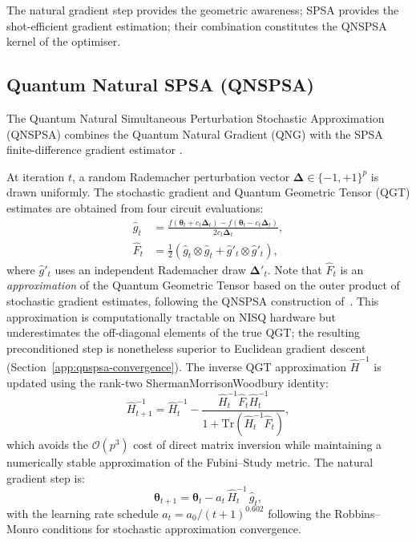 \documentclass[11pt,a4paper, english]{book}
\theoremstyle{plain}
\theoremstyle{definition}
\numberwithin{equation}{chapter}
\numberwithin{figure}{chapter}
\numberwithin{table}{chapter}
\begin{document}
The natural gradient step provides the geometric awareness; SPSA provides the
shot-efficient gradient estimation; their combination constitutes the QNSPSA kernel
of the optimiser.

\subsection{Quantum Natural SPSA (QNSPSA)}
\label{subsec:qnspsa}

The Quantum Natural Simultaneous Perturbation Stochastic Approximation
(QNSPSA) combines the Quantum Natural Gradient (QNG) \cite{Stokes_2020}
with the SPSA finite-difference gradient estimator \cite{Spall_1998}.

At iteration $t$, a random Rademacher perturbation vector
$\boldsymbol{\Delta} \in \{-1,+1\}^p$ is drawn uniformly.  The stochastic
gradient and Quantum Geometric Tensor (QGT) estimates are obtained from
four circuit evaluations:
\begin{align}
  \label{eq:qnspsa_gradient}
  \hat{g}_t &= \frac{f(\boldsymbol{\theta}_t + c_t\boldsymbol{\Delta}_t)
                     - f(\boldsymbol{\theta}_t - c_t\boldsymbol{\Delta}_t)}
                    {2c_t\boldsymbol{\Delta}_t}, \\
  \label{eq:qgt_estimate}
  \hat{F}_t &= \frac{1}{2}\!\left(
    \hat{g}_t \otimes \hat{g}_t
    + \hat{g}'_t \otimes \hat{g}'_t\right),
\end{align}
where $\hat{g}'_t$ uses an independent Rademacher draw $\boldsymbol{\Delta}'_t$.
Note that $\hat{F}_t$ is an \emph{approximation} of the 
Quantum Geometric Tensor based on the outer product of 
stochastic gradient estimates, following the QNSPSA 
construction of~\cite{Gacon_2021}. This approximation 
is computationally tractable on NISQ hardware but 
underestimates the off-diagonal elements of the true 
QGT; the resulting preconditioned step is nonetheless 
superior to Euclidean gradient descent 
(Section~\ref{app:qnspsa-convergence}).
The inverse QGT approximation $\hat{H}^{-1}$ is updated using the
rank-two ShermanMorrisonWoodbury identity:
\begin{equation}
  \label{eq:smw}
  \hat{H}^{-1}_{t+1} = \hat{H}^{-1}_t
    - \frac{\hat{H}^{-1}_t\hat{F}_t\hat{H}^{-1}_t}
           {1 + \mathrm{Tr}(\hat{H}^{-1}_t\hat{F}_t)},
\end{equation}
which avoids the $\mathcal{O}(p^3)$ cost of direct matrix inversion while
maintaining a numerically stable approximation of the Fubini--Study metric.
The natural gradient step is:
\begin{equation}
  \label{eq:ng_step}
  \boldsymbol{\theta}_{t+1} = \boldsymbol{\theta}_t
    - a_t\,\hat{H}^{-1}_t\,\hat{g}_t,
\end{equation}
with the learning rate schedule $a_t = a_0/(t + 1)^{0.602}$ following the
Robbins--Monro conditions \cite{RobbinsMonro_1951} for stochastic approximation convergence.
\end{document}
